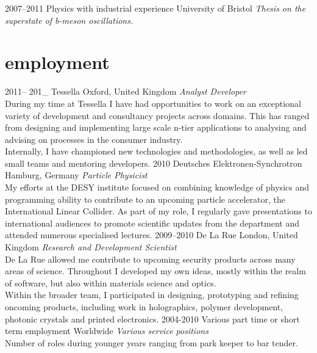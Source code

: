\documentclass[]{friggeri-cv} %
\begin{document}
\begin{entrylist}
\entry
{2007--2011}
{Physics {\normalfont with industrial experience}}
{University of Bristol}
{\emph{Thesis on the superstate of b-meson oscillations.} }
\end{entrylist}


\section{employment}

\begin{entrylist}
\entry
{2011-- 201\_ }
{Tessella}
{Oxford, United Kingdom}
{\emph{Analyst Developer} \\
During my time at Tessella I have had opportunities to work on an exceptional variety of development and consultancy projects across domains. This has ranged from designing and implementing large scale n-tier applications to analysing and advising on processes in the consumer industry.\\
Internally, I have championed new technologies and methodologies, as well as led small teams and mentoring developers.} 
\entry
{2010}
{Deutsches Elektronen-Synchrotron}
{Hamburg, Germany}
{\emph{Particle Physicist} \\
My efforts at the DESY institute focused on combining knowledge of physics and programming ability to contribute to an upcoming particle accelerator, the International Linear Collider. As part of my role, I regularly gave presentations to international audiences to promote scientific updates from the department and attended numerous specialised lectures.} 
\entry
{2009--2010}
{De La Rue}
{London, United Kingdom}
{\emph{Research and Development Scientist} \\
De La Rue allowed me contribute to upcoming security
products across many areas of science. Throughout I developed my own ideas, mostly within the realm of software, but also within materials science and optics. \\
Within the broader team, I participated in designing, prototyping and refining oncoming products, including work in holographics, polymer development, photonic crystals and printed electronics. }
\entry
{2004-2010}
{Various part time or short term employment}
{Worldwide}
{\emph{Various service positions} \\
Number of roles during younger years ranging from park keeper to bar tender.}
\end{entrylist}
\end{document}
